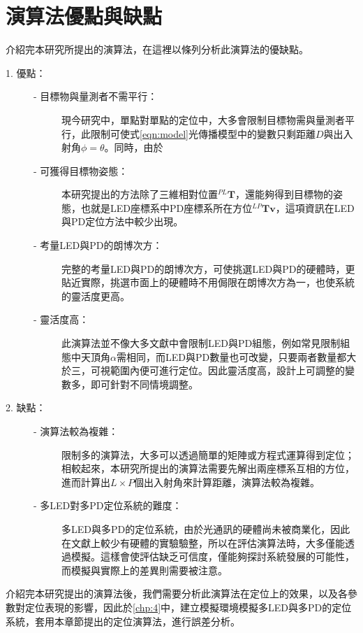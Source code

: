 \section{演算法優點與缺點}


介紹完本研究所提出的演算法，在這裡以條列分析此演算法的優缺點。


\begin{description}
    \item[1. 優點：]\hfill
    
    \begin{description}
        \item[- 目標物與量測者不需平行：]現今研究中，單點對單點的定位中，大多會限制目標物需與量測者平行，此限制可使式\ref{eqn:model}光傳播模型中的變數只剩距離$D$與出入射角$\phi=\theta$。同時，由於
        
        \item[- 可獲得目標物姿態：] 本研究提出的方法除了三維相對位置$^{PL}\boldsymbol{T}$，還能夠得到目標物的姿態，也就是LED座標系中PD座標系所在方位$^{LP}\boldsymbol{Tv}$，這項資訊在LED與PD定位方法中較少出現。
        
        \item[- 考量LED與PD的朗博次方：]完整的考量LED與PD的朗博次方，可使挑選LED與PD的硬體時，更貼近實際，挑選市面上的硬體時不用侷限在朗博次方為一，也使系統的靈活度更高。
        
        \item[- 靈活度高：] 此演算法並不像大多文獻中會限制LED與PD組態，例如常見限制組態中天頂角$\alpha$需相同，而LED與PD數量也可改變，只要兩者數量都大於三，可視範圍內便可進行定位。因此靈活度高，設計上可調整的變數多，即可針對不同情境調整。
    
    \end{description}

    \item[2. 缺點：] \hfill
    
    \begin{description}
        \item[- 演算法較為複雜：]  限制多的演算法，大多可以透過簡單的矩陣或方程式運算得到定位；相較起來，本研究所提出的演算法需要先解出兩座標系互相的方位，進而計算出$L\times P$個出入射角來計算距離，演算法較為複雜。
        \item[- 多LED對多PD定位系統的難度：] 多LED與多PD的定位系統，由於光通訊的硬體尚未被商業化，因此在文獻上較少有硬體的實驗驗整，所以在評估演算法時，大多僅能透過模擬。這樣會使評估缺乏可信度，僅能夠探討系統發展的可能性，而模擬與實際上的差異則需要被注意。
    \end{description}
    
\end{description}

介紹完本研究提出的演算法後，我們需要分析此演算法在定位上的效果，以及各參數對定位表現的影響，因此於\ref{chp:4}中，建立模擬環境模擬多LED與多PD的定位系統，套用本章節提出的定位演算法，進行誤差分析。









